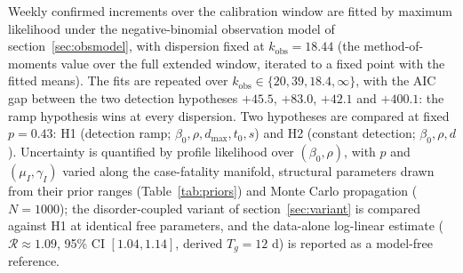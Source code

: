 \documentclass[preprint,12pt,numbers]{elsarticle}
\newcommand{\Reff}{\mathcal{R}}
\begin{document}
Weekly confirmed increments over the calibration window are fitted by
maximum likelihood under the negative-binomial observation model of
section~\ref{sec:obsmodel}, with dispersion fixed at $k_{\mathrm{obs}}=18.44$
(the method-of-moments value over the full extended window, iterated to
a fixed point with the fitted means). The fits are
repeated over $k_{\mathrm{obs}}\in\{20,39,18.4,\infty\}$, with the AIC gap
between the two detection hypotheses $+45.5$, $+83.0$, $+42.1$ and
$+400.1$: the ramp hypothesis wins at every dispersion. Two hypotheses
are compared at fixed $p=0.43$: H1 (detection ramp; $\beta_0,\rho,d_{\max},t_0,s$)
and H2 (constant detection; $\beta_0,\rho,d$). Uncertainty is quantified
by profile likelihood over $(\beta_0,\rho)$, with $p$ and $(\mu_I,\gamma_I)$
varied along the case-fatality manifold, structural parameters drawn from
their prior ranges (Table~\ref{tab:priors}) and Monte Carlo propagation
($N=1000$); the disorder-coupled variant of section~\ref{sec:variant}
is compared against H1 at identical free parameters, and the data-alone
log-linear estimate ($\Reff\approx1.09$, 95\% CI $[1.04,1.14]$, derived
$T_g=12$ d) is reported as a model-free reference.
\end{document}
